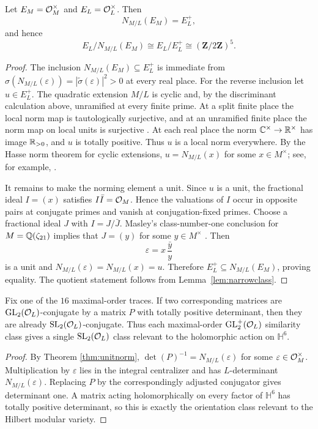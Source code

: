 \begin{theorem}\label{thm:unitnorm}
Let $E_M=\mathcal O_M^\times$ and $E_L=\mathcal O_L^\times$.  Then
\[
 N_{M/L}(E_M)=E_L^+,
\]
and hence
\[
 E_L/N_{M/L}(E_M)\cong E_L/E_L^+\cong(\mathbf Z/2\mathbf Z)^5.
\]
\end{theorem}
\begin{proof}
The inclusion $N_{M/L}(E_M)\subseteq E_L^+$ is immediate from
$\sigma(N_{M/L}(\varepsilon))=|\widetilde\sigma(\varepsilon)|^2>0$ at every real place.
For the reverse inclusion let $u\in E_L^+$.  The quadratic extension $M/L$ is cyclic and,
by the discriminant calculation above, unramified at every finite prime.  At a split finite
place the local norm map is tautologically surjective, and at an unramified finite place the
norm map on local units is surjective \cite[Chap.~III, Prop.~1.2, p.~98]{MilneCFT2020}.  At each real place the norm $\mathbb C^\times\to\mathbb R^\times$
has image $\mathbb R_{>0}$, and $u$ is totally positive.  Thus $u$ is a local norm everywhere.
By the Hasse norm theorem for cyclic extensions, $u=N_{M/L}(x)$ for some $x\in M^\times$;
see, for example, \cite[Chap.~VI, \S4, Cor.~(4.5), p.~384]{Neukirch}.

It remains to make the norming element a unit.  Since $u$ is a unit, the fractional ideal
$I=(x)$ satisfies $I\bar I=\mathcal O_M$.  Hence the valuations of $I$ occur in opposite pairs at
conjugate primes and vanish at conjugation-fixed primes.  Choose a fractional ideal $J$ with
$I=J/\bar J$.  Masley's class-number-one conclusion for
$M=\mathbb Q(\zeta_{21})$ implies that $J=(y)$ for some $y\in M^\times$ \cite[p.~179]{Masley1976}.
Then
\[
 \varepsilon=x\,\frac{\bar y}{y}
\]
is a unit and $N_{M/L}(\varepsilon)=N_{M/L}(x)=u$.  Therefore
$E_L^+\subseteq N_{M/L}(E_M)$, proving equality.  The quotient statement follows from
Lemma~\ref{lem:narrowclass}.
\end{proof}

\begin{corollary}\label{cor:orientedcollapse}
Fix one of the $16$ maximal-order traces.  If two corresponding matrices are
$\mathrm{GL}_2(\mathcal O_L)$-conjugate by a matrix $P$ with totally positive determinant, then
they are already $\mathrm{SL}_2(\mathcal O_L)$-conjugate.  Thus each maximal-order
$\mathrm{GL}_2^+(\mathcal O_L)$ similarity class gives a single
$\mathrm{SL}_2(\mathcal O_L)$ class relevant to the holomorphic action on $\mathbb H^6$.
\end{corollary}
\begin{proof}
By Theorem \ref{thm:unitnorm}, $\det(P)^{-1}=N_{M/L}(\varepsilon)$ for some
$\varepsilon\in\mathcal O_M^\times$.  Multiplication by $\varepsilon$ lies in the integral
centralizer and has $L$-determinant $N_{M/L}(\varepsilon)$.  Replacing $P$ by the
correspondingly adjusted conjugator gives determinant one.  A matrix acting
holomorphically on every factor of $\mathbb H^6$ has totally positive determinant, so this
is exactly the orientation class relevant to the Hilbert modular variety.
\end{proof}

